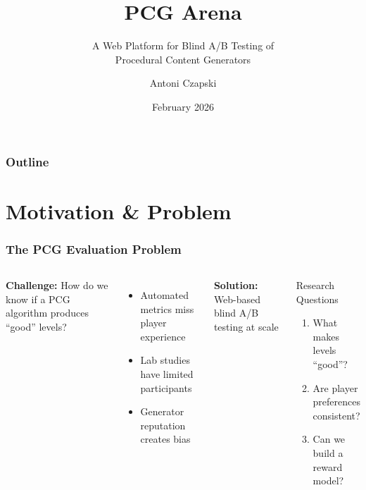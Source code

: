 \documentclass{beamer}
\title[PCG Arena]{PCG Arena}
\subtitle{A Web Platform for Blind A/B Testing of\\Procedural Content Generators}
\author{Antoni Czapski}
\institute[]{
  Artificial Intelligence $\heartsuit$ Games:\\
  Procedural Content Generation
}
\date{February 2026}
\begin{document}
\frame{\titlepage}

\begin{frame}
\frametitle{Outline}
\tableofcontents
\end{frame}

\section{Motivation \& Problem}

\begin{frame}
\frametitle{The PCG Evaluation Problem}

\begin{columns}
\textbf{Challenge:} How do we know if a PCG algorithm produces ``good'' levels?

\vspace{0.5em}
\begin{itemize}
    \item Automated metrics miss \alert{player experience}
    \item Lab studies have \alert{limited participants}
    \item Generator reputation creates \alert{bias}
\end{itemize}

\vspace{0.5em}
\textbf{Solution:} Web-based blind A/B testing at scale

\begin{block}{Research Questions}
\begin{enumerate}
    \item What makes levels ``good''?
    \item Are player preferences consistent?
    \item Can we build a reward model?
\end{enumerate}
\end{block}
\end{columns}

\end{frame}
\end{document}

